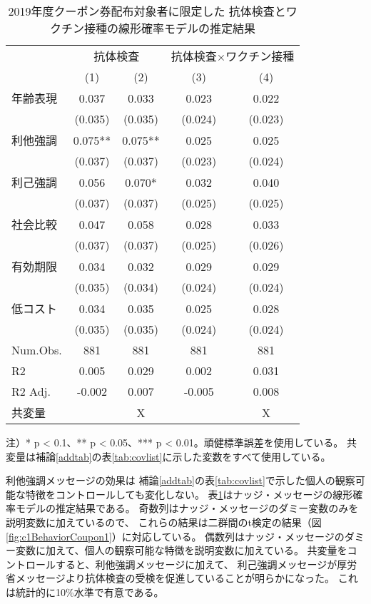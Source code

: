 \documentclass[
  11pt,
  a4paper,
]{article}
\begin{document}
\begin{table}

\caption{\label{tab:c1RegCoupon1}2019年度クーポン券配布対象者に限定した 抗体検査とワクチン接種の線形確率モデルの推定結果}
\centering
\fontsize{9}{11}\selectfont
\begin{threeparttable}
\begin{tabular}[t]{lcccc}
\toprule
\multicolumn{1}{c}{ } & \multicolumn{2}{c}{抗体検査} & \multicolumn{2}{c}{抗体検査×ワクチン接種} \\
\cmidrule(l{3pt}r{3pt}){2-3} \cmidrule(l{3pt}r{3pt}){4-5}
  & (1) & (2) & (3) & (4)\\
\midrule
年齢表現 & 0.037 & 0.033 & 0.023 & 0.022\\
 & (0.035) & (0.035) & (0.024) & (0.023)\\
利他強調 & 0.075** & 0.075** & 0.025 & 0.025\\
 & (0.037) & (0.037) & (0.023) & (0.024)\\
利己強調 & 0.056 & 0.070* & 0.032 & 0.040\\
 & (0.037) & (0.037) & (0.025) & (0.025)\\
社会比較 & 0.047 & 0.058 & 0.028 & 0.033\\
 & (0.037) & (0.037) & (0.025) & (0.026)\\
有効期限 & 0.034 & 0.032 & 0.029 & 0.029\\
 & (0.035) & (0.034) & (0.024) & (0.024)\\
低コスト & 0.034 & 0.035 & 0.025 & 0.028\\
 & (0.035) & (0.035) & (0.024) & (0.024)\\
\midrule
Num.Obs. & 881 & 881 & 881 & 881\\
R2 & 0.005 & 0.029 & 0.002 & 0.031\\
R2 Adj. & -0.002 & 0.007 & -0.005 & 0.008\\
共変量 &  & X &  & X\\
\bottomrule
\end{tabular}
\begin{tablenotes}
\item 注）* p < 0.1、** p < 0.05、*** p < 0.01。頑健標準誤差を使用している。 共変量は補論\ref{addtab}の表\ref{tab:covlist}に示した変数をすべて使用している。
\end{tablenotes}
\end{threeparttable}
\end{table}

利他強調メッセージの効果は
補論\ref{addtab}の表\ref{tab:covlist}で示した個人の観察可能な特徴をコントロールしても変化しない。
表\ref{tab:c1RegCoupon1}はナッジ・メッセージの線形確率モデルの推定結果である。
奇数列はナッジ・メッセージのダミー変数のみを説明変数に加えているので、
これらの結果は二群間のt検定の結果（図\ref{fig:c1BehaviorCoupon1}）に対応している。
偶数列はナッジ・メッセージのダミー変数に加えて、個人の観察可能な特徴を説明変数に加えている。
共変量をコントロールすると、利他強調メッセージに加えて、
利己強調メッセージが厚労省メッセージより抗体検査の受検を促進していることが明らかになった。
これは統計的に10\%水準で有意である。
\end{document}
